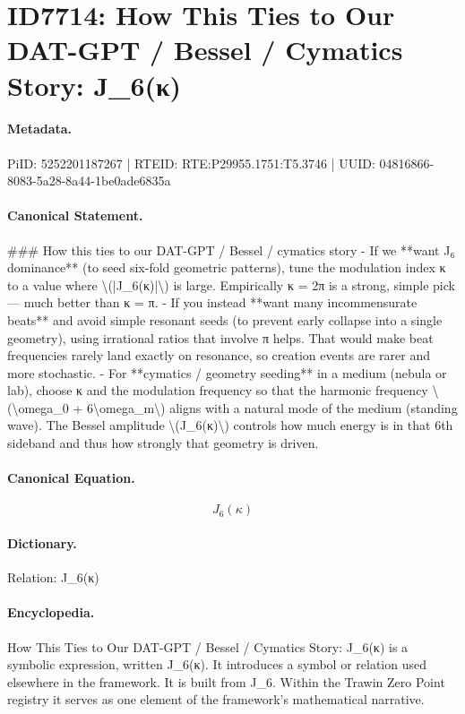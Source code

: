 \section*{ID7714: How This Ties to Our DAT-GPT / Bessel / Cymatics Story: J\_6(κ)}
\paragraph{Metadata.}
PiID: 5252201187267 | RTEID: RTE:P29955.1751:T5.3746 | UUID: 04816866-8083-5a28-8a44-1be0ade6835a

\paragraph{Canonical Statement.}
\#\#\# How this ties to our DAT-GPT / Bessel / cymatics story - If we **want J₆ dominance** (to seed six-fold geometric patterns), tune the modulation index κ to a value where \textbackslash{}(|J\_6(κ)|\textbackslash{}) is large. Empirically κ = 2π is a strong, simple pick — much better than κ = π. - If you instead **want many incommensurate beats** and avoid simple resonant seeds (to prevent early collapse into a single geometry), using irrational ratios that involve π helps. That would make beat frequencies rarely land exactly on resonance, so creation events are rarer and more stochastic. - For **cymatics / geometry seeding** in a medium (nebula or lab), choose κ and the modulation frequency so that the harmonic frequency \textbackslash{}(\textbackslash{}omega\_0 + 6\textbackslash{}omega\_m\textbackslash{}) aligns with a natural mode of the medium (standing wave). The Bessel amplitude \textbackslash{}(J\_6(κ)\textbackslash{}) controls how much energy is in that 6th sideband and thus how strongly that geometry is driven.

\paragraph{Canonical Equation.}
\[
J_6(κ)
\]

\paragraph{Dictionary.}
Relation: J\_6(κ)

\paragraph{Encyclopedia.}
How This Ties to Our DAT-GPT / Bessel / Cymatics Story: J\_6(κ) is a symbolic expression, written J\_6(κ). It introduces a symbol or relation used elsewhere in the framework. It is built from J\_6. Within the Trawin Zero Point registry it serves as one element of the framework's mathematical narrative.
